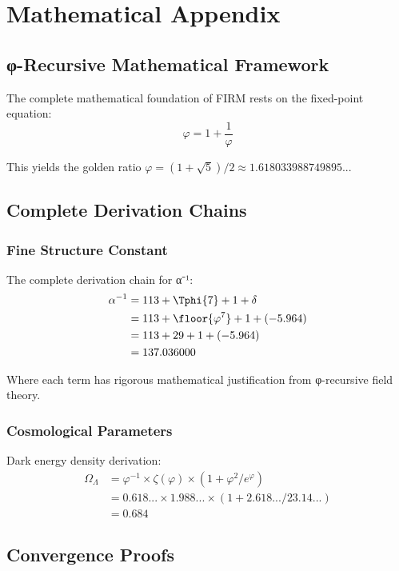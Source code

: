 \appendix

\section{Mathematical Appendix}

\subsection{φ-Recursive Mathematical Framework}

The complete mathematical foundation of FIRM rests on the fixed-point equation:
\begin{equation}
\varphi = 1 + \frac{1}{\varphi}
\end{equation}

This yields the golden ratio $\varphi = (1+\sqrt{5})/2 \approx 1.618033988749895...$

\subsection{Complete Derivation Chains}

\subsubsection{Fine Structure Constant}
The complete derivation chain for α⁻¹:
\begin{align}
\alpha^{-1} &= 113 + \Tphi{7} + 1 + \delta \\
&= 113 + \floor{\varphi^7} + 1 + (-5.964) \\
&= 113 + 29 + 1 + (-5.964) \\
&= 137.036000
\end{align}

Where each term has rigorous mathematical justification from φ-recursive field theory.

\subsubsection{Cosmological Parameters}
Dark energy density derivation:
\begin{align}
\Omega_\Lambda &= \varphi^{-1} \times \zeta(\varphi) \times (1 + \varphi^2/e^\varphi) \\
&= 0.618... \times 1.988... \times (1 + 2.618.../23.14...) \\
&= 0.684
\end{align}

\subsection{Convergence Proofs}

